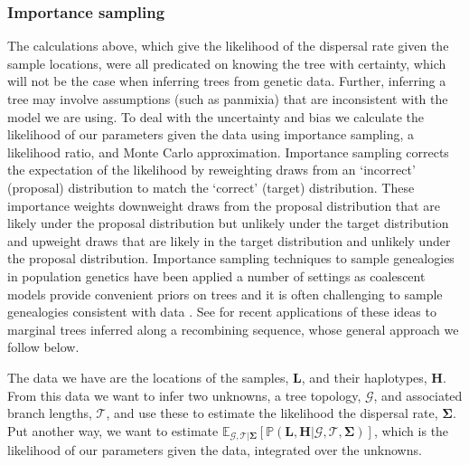 \documentclass[12pt]{article}
\begin{document}
\subsubsection*{Importance sampling}

The calculations above, which give the likelihood of the dispersal rate given the sample locations, were all predicated on knowing the tree with certainty, which will not be the case when inferring trees from genetic data.
Further, inferring a tree may involve assumptions (such as panmixia) that are inconsistent with the model we are using.
To deal with the uncertainty and bias we calculate the likelihood of our parameters given the data using importance sampling, a likelihood ratio, and Monte Carlo approximation.
Importance sampling corrects the expectation of the likelihood by reweighting draws from an `incorrect' (proposal) distribution to match the `correct' (target) distribution. 
These importance weights downweight draws from the proposal distribution that are likely under the proposal distribution but unlikely under the target distribution and upweight draws that are likely in the target distribution and unlikely under the proposal distribution. 
Importance sampling techniques to sample genealogies in population genetics have been applied a number of settings as coalescent models provide convenient priors on trees and it is often challenging to sample genealogies consistent with data \citep{griffiths1997computational,stephens2000inference,meligkotsidou2007postprocessing}. 
See \cite{stern2019approximate,stern2020disentangling} for recent applications of these ideas to marginal trees inferred along a recombining sequence, whose general approach we follow below.  

The data we have are the locations of the samples, $\mathbf{L}$, and their haplotypes, $\mathbf{H}$.
From this data we want to infer two unknowns, a tree topology, $\mathcal{G}$, and associated branch lengths, $\mathcal{T}$, and use these to estimate the likelihood the dispersal rate, $\mathbf{\Sigma}$.
Put another way, we want to estimate $\mathbb{E}_{\mathcal{G},\mathcal{T} | \mathbf{\Sigma}} \left[ \mathbb{P}(\mathbf{L},\mathbf{H} | \mathcal{G},\mathcal{T},\mathbf{\Sigma}) \right]$, which is the likelihood of our parameters given the data, integrated over the unknowns. 
\end{document}
